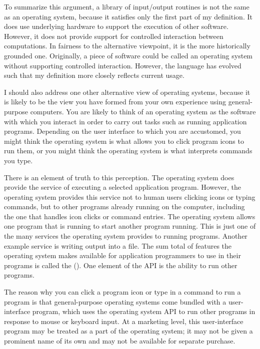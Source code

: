 To summarize this argument, a library of input/output routines is not
the same as an operating system, because it satisfies only the first
part of my definition.  It does use underlying hardware to support the
execution of other software.  However, it does not provide support for
controlled interaction between computations.  In fairness to the
alternative viewpoint, it is the more historically grounded one.
Originally, a piece of software could be called an operating system
without supporting controlled interaction.  However, the language has
evolved such that my definition more closely reflects current usage.

I should also address one other alternative view of operating systems,
because it is likely to be the view you have formed from your own
experience using general-purpose computers.  You are likely to think
of an operating system as the software with which you interact in order to
carry out tasks such as running application programs.  Depending on
the user interface to which you are accustomed, you might think the
operating system is what allows you to click program icons to run
them, or you might think the operating system is what interprets
commands you type.

There is an element of truth to this perception.  The operating system
does provide the service of executing a selected application program.
However, the operating system provides this service not to human users
clicking icons or typing commands, but to other programs already
running on the computer, including the one that handles icon clicks or
command entries.  The operating system allows one program that is
running to start another program running.  This is just one of the
many services the operating system provides to running programs.
Another example service is
writing output into a file.  The sum total of features the
operating system makes available for application programmers to use in
their programs is called the 
().  One element of the API is the ability to run other programs.

The reason why you can click a program icon or type in a command to
run a program is that general-purpose operating systems come bundled
with a user-interface program, which uses the operating system API to
run other programs in response to mouse or keyboard input.  At a
marketing level, this user-interface program may be treated as a part of
the operating system; it may not be given a prominent name of its own
and may not be available for separate purchase.

